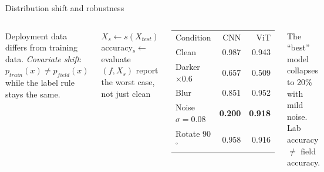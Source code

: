 \documentclass[aspectratio=169,11pt]{beamer}
\begin{document}
\begin{frame}{Distribution shift and robustness}
\begin{columns}[T]
\begin{bdef}
Deployment data differs from training data. \emph{Covariate shift}: $p_{train}(x)\neq p_{field}(x)$ while the label rule stays the same.
\end{bdef}
\begin{balgo}
\begin{algorithmic}[1]
  \State $X_s\gets s(X_{test})$
  \State accuracy$_s\gets$ evaluate$(f, X_s)$
\EndFor
\State report the worst case, not just clean
\end{algorithmic}
\end{balgo}
\begin{bres}
\begin{tabular}{lrr}
Condition & CNN & ViT\\
Clean & 0.987 & 0.943\\
Darker $\times0.6$ & 0.657 & 0.509\\
Blur & 0.851 & 0.952\\
Noise $\sigma{=}0.08$ & \alert{\textbf{0.200}} & \textbf{0.918}\\
Rotate 90$^\circ$ & 0.958 & 0.916\\
\end{tabular}
\end{bres}
\begin{bwarn}
The ``best'' model collapses to 20\% with mild noise. Lab accuracy $\neq$ field accuracy.
\end{bwarn}
\end{columns}
\end{frame}
\end{document}
